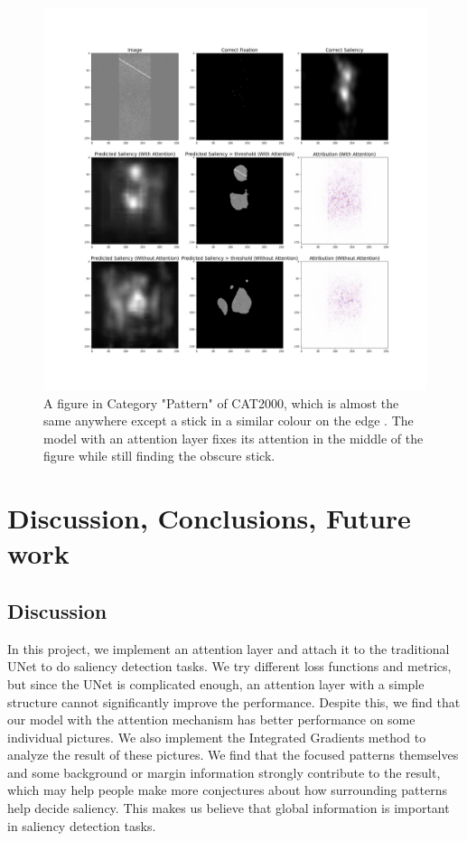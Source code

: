 \documentclass[12pt]{article}
\begin{document}
\begin{figure}[!h]
    \centering
    \includegraphics[width=7in]{imgs/used_example_2.png}
    \caption{A figure in Category "Pattern" of CAT2000, which is almost the same anywhere except a stick in a similar colour on the edge . The model with an attention layer fixes its attention in the middle of the figure while still finding the obscure stick.}
    \label{img:int_example_2}
\end{figure}







\section{Discussion, Conclusions, Future work}
\subsection{Discussion}

In this project, we implement an attention layer and attach it to the traditional UNet to do saliency detection tasks.
We try different loss functions and metrics, but since the UNet is complicated enough, an attention layer with a simple structure cannot significantly improve the performance.
Despite this, we find that our model with the attention mechanism has better performance on some individual pictures.
We also implement the Integrated Gradients method to analyze the result of these pictures.
We find that the focused patterns themselves and some background or margin information strongly contribute to the result, which may help people make more conjectures about how surrounding patterns help decide saliency.
This makes us believe that global information is important in saliency detection tasks.
\end{document}
